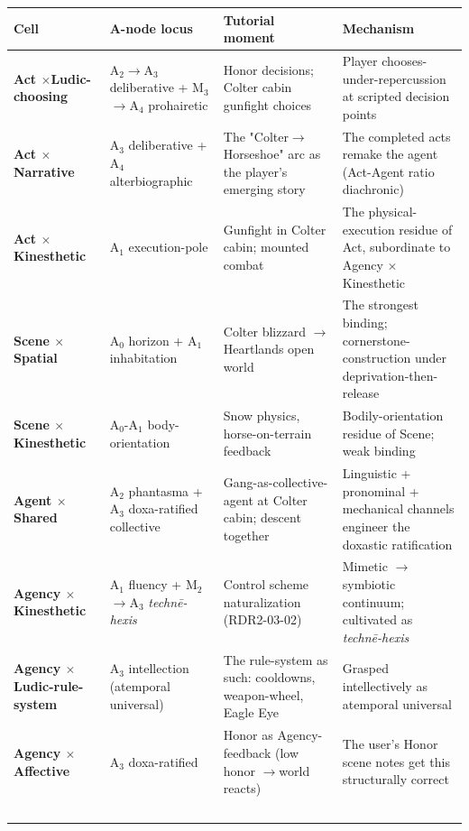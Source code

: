\documentclass[11pt]{report}
\begin{document}
\begin{table}[H]
\small
\renewcommand{\arraystretch}{1.25}
\begin{tabularx}{\textwidth}{>{\RaggedRight\arraybackslash}X>{\RaggedRight\arraybackslash}X>{\RaggedRight\arraybackslash}X>{\RaggedRight\arraybackslash}X}
\toprule
Cell & A-node locus & Tutorial moment & Mechanism \\
\midrule
\textbf{Act $\times$\allowbreak  Ludic-choosing} & A$_2$$\rightarrow$\allowbreak A$_3$ deliberative + M$_3$$\rightarrow$\allowbreak A$_4$ prohairetic & Honor decisions; Colter cabin gunfight choices & Player chooses-under-repercussion at scripted decision points \\
\textbf{Act $\times$\allowbreak  Narrative} & A$_3$ deliberative + A$_4$ alterbiographic & The "Colter$\rightarrow$\allowbreak Horseshoe" arc as the player's emerging story & The completed acts remake the agent (Act-Agent ratio diachronic) \\
\textbf{Act $\times$\allowbreak  Kinesthetic} & A$_1$ execution-pole & Gunfight in Colter cabin; mounted combat & The physical-execution residue of Act, subordinate to Agency $\times$\allowbreak  Kinesthetic \\
\textbf{Scene $\times$\allowbreak  Spatial} & A$_0$ horizon + A$_1$ inhabitation & Colter blizzard $\rightarrow$\allowbreak  Heartlands open world & The strongest binding; cornerstone-construction under deprivation-then-release \\
\textbf{Scene $\times$\allowbreak  Kinesthetic} & A$_0$-A$_1$ body-orientation & Snow physics, horse-on-terrain feedback & Bodily-orientation residue of Scene; weak binding \\
\textbf{Agent $\times$\allowbreak  Shared} & A$_2$ phantasma + A$_3$ doxa-ratified collective & Gang-as-collective-agent at Colter cabin; descent together & Linguistic + pronominal + mechanical channels engineer the doxastic ratification \\
\textbf{Agency $\times$\allowbreak  Kinesthetic} & A$_1$ fluency + M$_2$$\rightarrow$\allowbreak A$_3$ \textit{technē-hexis} & Control scheme naturalization (RDR2-03-02) & Mimetic $\rightarrow$\allowbreak  symbiotic continuum; cultivated as \textit{technē-hexis} \\
\textbf{Agency $\times$\allowbreak  Ludic-rule-system} & A$_3$ intellection (atemporal universal) & The rule-system as such: cooldowns, weapon-wheel, Eagle Eye & Grasped intellectively as atemporal universal \\
\textbf{Agency $\times$\allowbreak  Affective} & A$_3$ doxa-ratified & Honor as Agency-feedback (low honor $\rightarrow$\allowbreak  world reacts) & The user's Honor scene notes get this structurally correct \\
$$
\end{tabularx}
\end{table}
\end{document}
